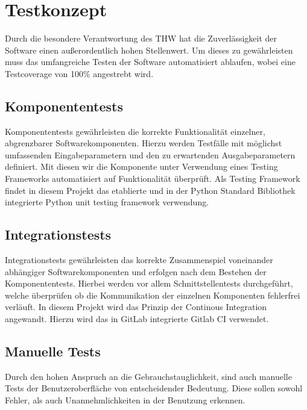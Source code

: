 \section{Testkonzept}
Durch die besondere Verantwortung des THW hat die Zuverlässigkeit der Software einen außerordentlich hohen Stellenwert. Um dieses zu gewährleisten muss das umfangreiche Testen der Software automatisiert ablaufen, wobei eine Testcoverage von 100\% angestrebt wird.
\subsection{Komponententests}
Komponententests gewährleisten die korrekte Funktionalität einzelner, abgrenzbarer Softwarekomponenten. Hierzu werden Testfälle mit möglichst umfassenden Eingabeparametern und den zu erwartenden Ausgabeparametern definiert. Mit diesen wir die Komponente unter Verwendung eines Testing Frameworks automatisiert auf Funktionalität überprüft. Als Testing Framework findet in diesem Projekt das etablierte und in der Python Standard Bibliothek integrierte Python unit testing framework verwendung.
\subsection{Integrationstests} 
Integrationstests gewährleisten das korrekte Zusammenspiel voneinander abhängiger Softwarekomponenten und erfolgen nach dem Bestehen der Komponententests. Hierbei werden vor allem Schnittstellentests durchgeführt, welche überprüfen ob die Kommunikation der einzelnen Komponenten fehlerfrei verläuft. In diesem Projekt wird das Prinzip der Continous Integration angewandt. Hierzu wird das in GitLab integrierte Gitlab CI verwendet.
\subsection{Manuelle Tests}
Durch den hohen Anspruch an die Gebrauchstauglichkeit, sind auch manuelle Tests der Benutzeroberfläche von entscheidender Bedeutung. Diese sollen sowohl Fehler, als auch Unannehmlichkeiten in der Benutzung erkennen.